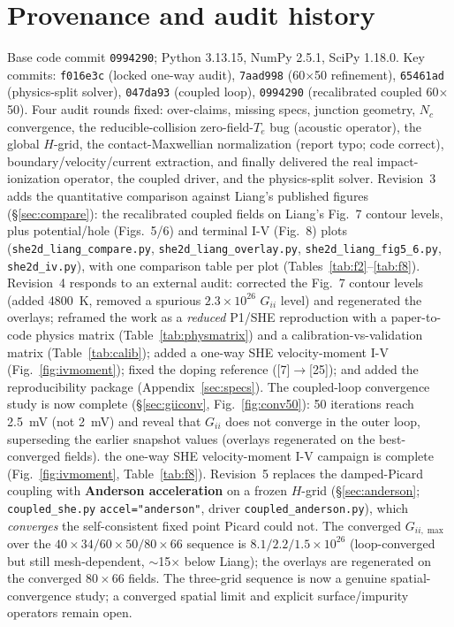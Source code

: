 \documentclass[11pt]{article}
\begin{document}
\section{Provenance and audit history}\label{sec:history}
Base code commit \texttt{0994290}; Python 3.13.15, NumPy 2.5.1, SciPy 1.18.0. Key commits:
\texttt{f016e3c} (locked one-way audit), \texttt{7aad998} (60$\times$50 refinement),
\texttt{65461ad} (physics-split solver), \texttt{047da93} (coupled loop), \texttt{0994290}
(recalibrated coupled 60$\times$50). Four audit rounds fixed:
over-claims, missing specs, junction geometry, $N_c$ convergence, the reducible-collision
zero-field-$T_e$ bug (acoustic operator), the global $H$-grid, the contact-Maxwellian
normalization (report typo; code correct), boundary/velocity/current extraction, and finally
delivered the real impact-ionization operator, the coupled driver, and the physics-split solver.
Revision~3 adds the quantitative comparison against Liang's published figures
(\S\ref{sec:compare}): the recalibrated coupled fields on Liang's Fig.~7 contour levels, plus
potential/hole (Figs.~5/6) and terminal I-V (Fig.~8) plots
(\texttt{she2d\_liang\_compare.py}, \texttt{she2d\_liang\_overlay.py},
\texttt{she2d\_liang\_fig5\_6.py}, \texttt{she2d\_iv.py}), with one comparison table per plot
(Tables~\ref{tab:f2}--\ref{tab:f8}).
Revision~4 responds to an external audit: corrected the Fig.~7 contour levels (added \SI{4800}{K},
removed a spurious $2.3\times10^{26}$ $G_{ii}$ level) and regenerated the overlays; reframed the
work as a \emph{reduced} P1/SHE reproduction with a paper-to-code physics matrix
(Table~\ref{tab:physmatrix}) and a calibration-vs-validation matrix (Table~\ref{tab:calib});
added a one-way SHE velocity-moment I-V (Fig.~\ref{fig:ivmoment}); fixed the doping reference
([7]$\to$[25]); and added the reproducibility package (Appendix~\ref{sec:specs}). The coupled-loop convergence study is
now complete (\S\ref{sec:giiconv}, Fig.~\ref{fig:conv50}): 50 iterations reach \SI{2.5}{mV} (not
\SI{2}{mV}) and reveal that $G_{ii}$ does not converge in the outer loop, superseding the earlier
snapshot values (overlays regenerated on the best-converged fields). the one-way SHE velocity-moment I-V
campaign is complete (Fig.~\ref{fig:ivmoment}, Table~\ref{tab:f8}).
Revision~5 replaces the damped-Picard coupling with \textbf{Anderson acceleration} on a frozen
$H$-grid (\S\ref{sec:anderson}; \texttt{coupled\_she.py} \texttt{accel="anderson"}, driver
\texttt{coupled\_anderson.py}), which \emph{converges} the self-consistent fixed point Picard could
not. The converged $G_{ii,\max}$ over the $40{\times}34/60{\times}50/80{\times}66$ sequence is
$8.1/2.2/1.5\times10^{26}$ (loop-converged but still mesh-dependent, $\sim$15$\times$ below Liang);
the overlays are regenerated on the converged $80{\times}66$ fields. The three-grid sequence is now
a genuine spatial-convergence study; a converged spatial limit and explicit surface/impurity
operators remain open.
\end{document}

